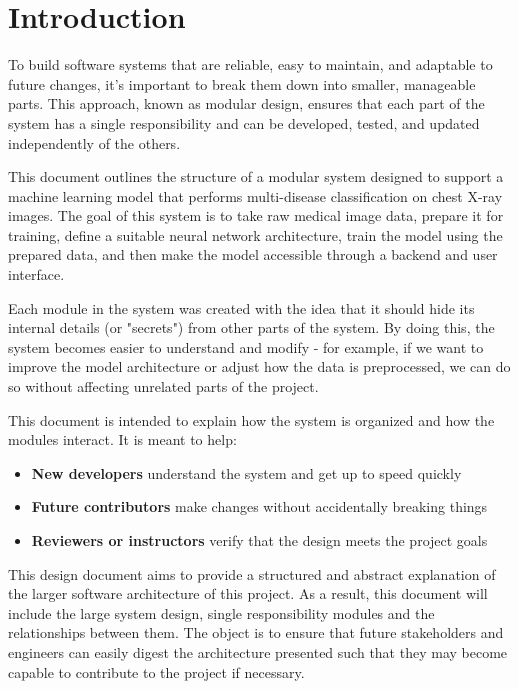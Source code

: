 \documentclass[12pt, titlepage]{article}
\begin{document}
\section{Introduction}

To build software systems that are reliable, easy to maintain, and adaptable to future changes, it's important to break them down into smaller, manageable parts. This approach, known as modular design, ensures that each part of the system has a single responsibility and can be developed, tested, and updated independently of the others.

This document outlines the structure of a modular system designed to support a machine learning model that performs multi-disease classification on chest X-ray images. The goal of this system is to take raw medical image data, prepare it for training, define a suitable neural network architecture, train the model using the prepared data, and then make the model accessible through a backend and user interface.

Each module in the system was created with the idea that it should hide its internal details (or "secrets") from other parts of the system. By doing this, the system becomes easier to understand and modify - for example, if we want to improve the model architecture or adjust how the data is preprocessed, we can do so without affecting unrelated parts of the project.

This document is intended to explain how the system is organized and how the modules interact. It is meant to help:

\begin{itemize}
    \item \textbf{New developers} understand the system and get up to speed quickly
    \item \textbf{Future contributors} make changes without accidentally breaking things
    \item \textbf{Reviewers or instructors} verify that the design meets the project goals
\end{itemize}

This design document aims to provide a structured and abstract explanation of the larger software architecture of this project. As a result, this document will include the large system design, single responsibility modules and the relationships between them. The object is to ensure that future stakeholders and engineers can easily digest the architecture presented such that they may become capable to contribute to the project if necessary.
\end{document}
